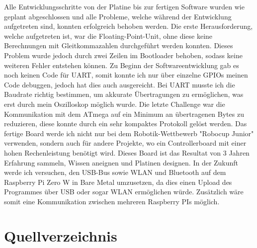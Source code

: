 \documentclass[12pt]{article}
\begin{document}
Alle Entwicklungsschritte von der Platine bis zur fertigen Software wurden wie geplant abgeschlossen und alle Probleme, welche während der Entwicklung aufgetreten sind, konnten erfolgreich behoben werden. Die erste Herausforderung, welche aufgetreten ist, war die Floating-Point-Unit, ohne diese keine Berechnungen mit Gleitkommazahlen durchgeführt werden konnten. Dieses Problem wurde jedoch durch zwei Zeilen im Bootloader behoben, sodass keine weiteren Fehler entstehen können. Zu Beginn der Softwareentwicklung gab es noch keinen Code für UART, somit konnte ich nur über einzelne GPIOs meinen Code debuggen, jedoch hat dies auch ausgereicht. Bei UART musste ich die Baudrate richtig bestimmen, um akkurate Übertragungen zu ermöglichen, was erst durch mein Oszilloskop möglich wurde. Die letzte Challenge war die Kommunikation mit dem ATmega auf ein Minimum an übertragenen Bytes zu reduzieren, diese konnte durch ein sehr kompaktes Protokoll gelöst werden. Das fertige Board werde ich nicht nur bei dem Robotik-Wettbewerb "Robocup Junior" verwenden, sondern auch für andere Projekte, wo ein Controllerboard mit einer hohen Rechenleistung benötigt wird. Dieses Board ist das Resultat von 3 Jahren Erfahrung sammeln, Wissen aneignen und Platinen designen. In der Zukunft werde ich versuchen, den USB-Bus sowie WLAN und Bluetooth auf dem Raspberry Pi Zero W in Bare Metal umzusetzen, da dies einen Upload des Programmes über USB oder sogar WLAN ermöglichen würde. Zusätzlich wäre somit eine Kommunikation zwischen mehreren Raspberry PIs möglich.
\newpage\section{Quellverzeichnis}
\end{document}
